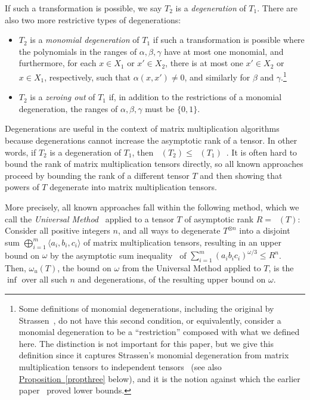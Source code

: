 \documentclass[11pt]{article}
\numberwithin{equation}{section}
\theoremstyle{definition}
\theoremstyle{plain}
\newcommand{\expref}[2]{\hyperref[#2]{#1~\ref{#2}}}
\newcommand{\trr}{\mathop{\tilde{\operatorname{R}}}}
\theoremstyle{definition}
\begin{document}
If such a transformation is possible, we say $T_2$ is a \emph{degeneration} of $T_1$. There are also two more restrictive types of degenerations:
\begin{itemize}
\item $T_2$ is a \emph{monomial degeneration} of $T_1$ if such a transformation is possible where the polynomials in the ranges of $\alpha, \beta, \gamma$ have at most one monomial, and furthermore, for each $x \in X_1$ or $x' \in X_2$, there is at most one $x' \in X_2$ or $x \in X_1$, respectively, such that $\alpha(x,x') \neq 0$, and similarly for $\beta$ and $\gamma$.\footnote{Some definitions of monomial degenerations, including the original by Strassen~\cite{strassenlaser1}, do not have this second condition, or equivalently, consider a monomial degeneration to be a ``restriction'' composed with what we defined here. The distinction is not important for this paper, but we give this definition since it captures Strassen's monomial degeneration from matrix multiplication tensors to independent tensors~\cite{laser} (see also \expref{Proposition}{propthree} below), and it is the notion
%
against which the earlier paper~\cite{aw} proved lower bounds.}  

    \item $T_2$ is a \emph{zeroing out} of $T_1$ if, in addition to the restrictions of a monomial degeneration, the ranges of $\alpha, \beta, \gamma$ must be $\{0,1\}$.
\end{itemize}

Degenerations are useful in the context of matrix multiplication algorithms because degenerations cannot increase the asymptotic rank of a tensor. In other words, if $T_2$ is a degeneration of $T_1$, then $\trr(T_2) \leq \trr(T_1)$~\cite{bini1980border}. It is often hard to bound the rank of matrix multiplication tensors directly, so all known approaches proceed by bounding the rank of a different tensor $T$ and then showing that powers of $T$ degenerate into matrix multiplication tensors.

More precisely, all known approaches fall within the following method, which we call the \emph{Universal Method}~\cite{aw} applied to a tensor $T$ of asymptotic rank $R = \trr(T)$: Consider all positive integers $n$, and all ways to degenerate $T^{\otimes n}$ into a disjoint sum $\bigoplus_{i=1}^m \langle a_i, b_i, c_i \rangle$ of matrix multiplication tensors, resulting in an upper bound on $\omega$ by the asymptotic sum inequality~\cite{Sch81} of $\sum_{i=1}^m (a_i b_i c_i)^{\omega/3} \leq R^n$. Then, $\omega_u(T)$, the bound on $\omega$ from the Universal Method applied to $T$, is the $\inf$ over all such $n$ and degenerations, of the resulting upper bound on $\omega$.
\end{document}
